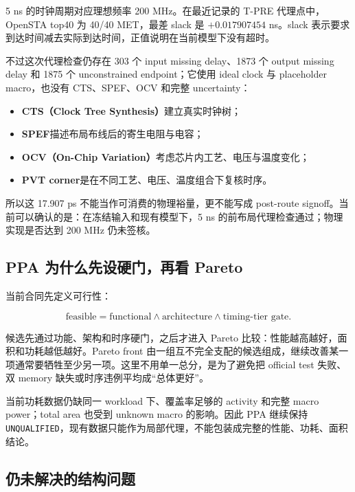 \documentclass[UTF8,a4paper,zihao=-4,oneside]{ctexart}
\newcommand{\statusword}[1]{\texttt{#1}}
\begin{document}
5 ns 的时钟周期对应理想频率 200 MHz。在最近记录的 T-PRE 代理点中，OpenSTA top40 为 40/40 MET，最差 slack 是 $+0.017907454$ ns。slack 表示要求到达时间减去实际到达时间，正值说明在当前模型下没有超时。

不过这次代理检查仍存在 303 个 input missing delay、1873 个 output missing delay 和 1875 个 unconstrained endpoint；它使用 ideal clock 与 placeholder macro，也没有 CTS、SPEF、OCV 和完整 uncertainty：

\begin{itemize}
  \item \textbf{CTS（Clock Tree Synthesis）}建立真实时钟树；
  \item \textbf{SPEF}描述布局布线后的寄生电阻与电容；
  \item \textbf{OCV（On-Chip Variation）}考虑芯片内工艺、电压与温度变化；
  \item \textbf{PVT corner}是在不同工艺、电压、温度组合下复核时序。
\end{itemize}

所以这 17.907 ps 不能当作可消费的物理裕量，更不能写成 post-route signoff。当前可以确认的是：在冻结输入和现有模型下，5 ns 的前布局代理检查通过；物理实现是否达到 200 MHz 仍未签核。

\subsection{PPA 为什么先设硬门，再看 Pareto}

当前合同先定义可行性：

\begin{equation}
  \text{feasible}
  = \text{functional}
    \land \text{architecture}
    \land \text{timing-tier gate}.
\end{equation}

候选先通过功能、架构和时序硬门，之后才进入 Pareto 比较：性能越高越好，面积和功耗越低越好。Pareto front 由一组互不完全支配的候选组成，继续改善某一项通常要牺牲至少另一项。这里不用单一总分，是为了避免把 official test 失败、双 memory 缺失或时序违例平均成“总体更好”。

当前功耗数据仍缺同一 workload 下、覆盖率足够的 activity 和完整 macro power；total area 也受到 unknown macro 的影响。因此 PPA 继续保持 \statusword{UNQUALIFIED}，现有数据只能作为局部代理，不能包装成完整的性能、功耗、面积结论。

\subsection{仍未解决的结构问题}
\end{document}

